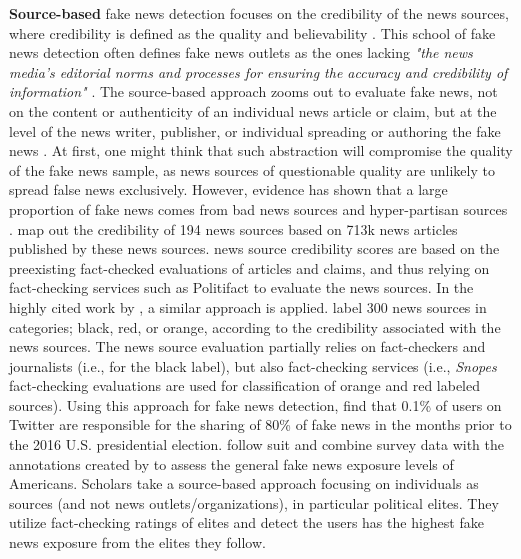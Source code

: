 \documentclass[
10pt, %
a4paper, %
oneside, %
headinclude,footinclude, %
] {book}%
\begin{document}
\textbf{Source-based} fake news detection focuses on the credibility of the news sources, where credibility is defined as the quality and believability \citep{zhou2020survey}. This school of fake news detection often defines fake news outlets as the ones lacking \emph{"the news
media’s editorial norms and processes for ensuring the accuracy and credibility of information"} \citep{lazer2018science, grinberg2019partisanship}. The source-based approach zooms out to evaluate fake news, not on the content or authenticity of an individual news article or claim, but at the level of the news writer, publisher, or individual spreading or authoring the fake news \citep{zhou2020survey}. At first, one might think that such abstraction will compromise the quality of the fake news sample, as news sources of questionable quality are unlikely to spread false news exclusively. However, evidence has shown that a large proportion of fake news comes from bad news sources and hyper-partisan sources \citep{silverman2016buzzfeed}. \cite{norregaard2019dataset} map out the credibility of 194 news sources based on 713k news articles published by these news sources. \cite{norregaard2019dataset} news source credibility scores are based on the preexisting fact-checked evaluations of articles and claims, and thus relying on fact-checking services such as Politifact to evaluate the news sources. In the highly cited work by \cite{grinberg2019partisanship}, a similar approach is applied. \cite{grinberg2019partisanship} label 300 news sources in categories; black, red, or orange, according to the credibility associated with the news sources. The news source evaluation partially relies on fact-checkers and journalists (i.e., for the black label), but also fact-checking services (i.e., \emph{Snopes} fact-checking evaluations are used for classification of orange and red labeled sources). Using this approach for fake news detection, \cite{grinberg2019partisanship} find that 0.1\% of users on Twitter are responsible for the sharing of 80\% of fake news in the months prior to the 2016 U.S. presidential election. \cite{guess2020exposure} follow suit and combine survey data with the annotations created by \cite{grinberg2019partisanship} to assess the general fake news exposure levels of Americans. Scholars \cite{mosleh2021elites} take a source-based approach focusing on individuals as sources (and not news outlets/organizations), in particular political elites. They utilize fact-checking ratings of elites and detect the users has the highest fake news exposure from the elites they follow.
\end{document}
